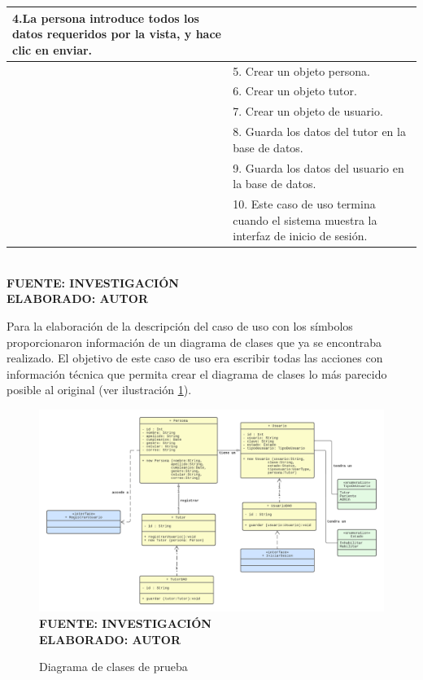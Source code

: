 \begin{table}[h!]
\begin{tabular}{| p{7cm} | p{7cm} |}
	4.La persona introduce todos los datos requeridos por la vista, y hace clic en enviar. & \\ \hline
	& 5. Crear un objeto persona. \\ \hline
	& 6. Crear un objeto tutor. \\ \hline
	& 7. Crear un objeto de usuario. \\ \hline
	& 8. Guarda los datos del tutor en la base de datos. \\ \hline
	& 9. Guarda los datos del usuario en la base de datos. \\ \hline
	& 10. Este caso de uso termina cuando el sistema muestra la interfaz de inicio de sesión.  \\ \hline
		\end{tabular}
		\vspace{4mm}
	{\footnotesize \textbf{\\ FUENTE: INVESTIGACIÓN} \textbf{\\ ELABORADO: AUTOR}}
\end{table}


Para la elaboración de la descripción del caso de uso con los símbolos proporcionaron información de un diagrama de clases que ya se encontraba realizado. El objetivo de este caso de uso era escribir todas las acciones con información técnica que permita crear el diagrama de clases lo más parecido posible al original (ver ilustración \ref{fig:cdtest}).

\begin{figure}[h!]
	\centering
	\caption{Diagrama de clases de prueba}
	\includegraphics[width=13.2cm]{img/cdtest.png}
	\label{fig:cdtest}
	\vspace{4mm}
	{\footnotesize \textbf{\\ FUENTE: INVESTIGACIÓN} \textbf{\\ ELABORADO: AUTOR}}
\end{figure}

